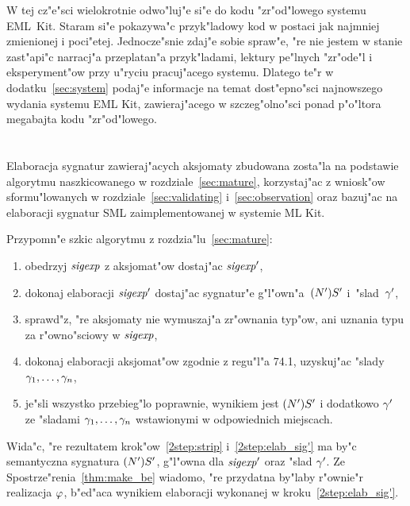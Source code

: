 
W tej cz"e"sci wielokrotnie odwo"luj"e si"e do kodu "zr"od"lowego
systemu EML~Kit. Staram si"e pokazywa"c przyk"ladowy kod w postaci 
jak najmniej zmienionej i poci"etej.
Jednocze"snie zdaj"e sobie spraw"e, "re nie jestem w stanie zast"api"c narracj"a przeplatan"a przyk"ladami,
lektury pe"lnych "zr"ode"l i eksperyment"ow przy u"ryciu pracuj"acego systemu.
Dlatego te"r w dodatku~\ref{sec:system} podaj"e informacje na temat 
dost"epno"sci najnowszego wydania systemu EML Kit,
zawieraj"acego w szczeg"olno"sci ponad p"o"ltora megabajta kodu "zr"od"lowego.

\section{\secimplaxioms}
\label{sec:impl_axioms}

Elaboracja sygnatur zawieraj"acych aksjomaty zbudowana zosta"la
na podstawie algorytmu naszkicowanego w rozdziale~\ref{sec:mature},
korzystaj"ac z wniosk"ow sformu"lowanych w rozdziale~\ref{sec:validating} i~\ref{sec:observation}
oraz bazuj"ac na elaboracji sygnatur SML zaimplementowanej w systemie ML Kit.

Przypomn"e szkic algorytmu z rozdzia"lu~\ref{sec:mature}:
\begin{enumerate}
\item obedrzyj ${\it sigexp}$ z aksjomat"ow dostaj"ac ${\it sigexp}'$,
\label{2step:strip}
\item dokonaj elaboracji ${\it sigexp}'$ dostaj"ac sygnatur"e g"l"own"a~$(N')S'$ i~"slad~$\gamma'$,
\label{2step:elab_sig'}
\item sprawd"z, "re aksjomaty nie wymuszaj"a zr"ownania typ"ow, 
      ani uznania typu za r"owno"sciowy w ${\it sigexp}$,
\label{2step:check}
\item dokonaj elaboracji aksjomat"ow zgodnie z regu"l"a 74.1, uzyskuj"ac "slady $\gamma_1,\dots,\gamma_n$,
\label{2step:elab_axiom}
\item je"sli wszystko przebieg"lo poprawnie, wynikiem jest $(N')S'$ i dodatkowo $\gamma'$ 
      ze "sladami $\gamma_1,\dots,\gamma_n$ wstawionymi w odpowiednich miejscach.
\label{2step:insert}
\end{enumerate}

Wida"c, "re rezultatem krok"ow~\ref{2step:strip} i~\ref{2step:elab_sig'}
ma by"c semantyczna sygnatura $(N')S'$, g"l"owna dla ${\it sigexp}'$ oraz "slad $\gamma'$.
Ze Spostrze"renia~\ref{thm:make_be} wiadomo, "re przydatna by"laby r"ownie"r
realizacja $\varphi$, b"ed"aca wynikiem elaboracji wykonanej w kroku~\ref{2step:elab_sig'}.

